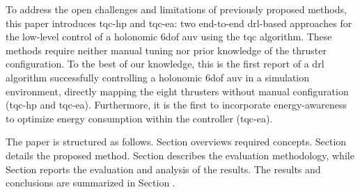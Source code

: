 
To address the open challenges and limitations of previously proposed methods, this paper introduces \ac{tqc-hp} and \ac{tqc-ea}: two end-to-end \ac{drl}-based approaches for the low-level control of a holonomic \ac{6dof} \ac{auv} using the \ac{tqc} algorithm. These methods require neither manual tuning nor prior knowledge of the thruster configuration. To the best of our knowledge, this is the first report of a \ac{drl} algorithm successfully controlling a holonomic \ac{6dof} \ac{auv} in a simulation environment, directly mapping the eight thrusters without manual configuration (\ac{tqc-hp} and \ac{tqc-ea}). Furthermore, it is the first to incorporate energy-awareness to optimize energy consumption within the controller (\ac{tqc-ea}).

The paper is structured as follows. Section  overviews required concepts. Section  details the proposed method. Section  describes the evaluation methodology, while Section  reports the evaluation and analysis of the results. The results and conclusions are summarized in Section .